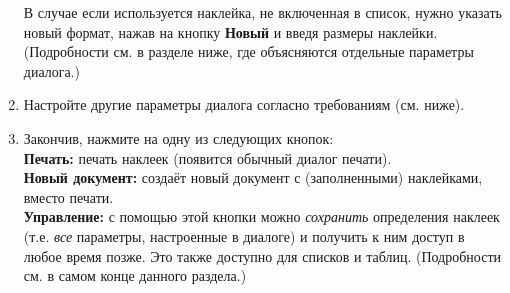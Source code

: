 ﻿\documentclass[a4paper,10pt]{article}
\begin{document}
\begin{enumerate}
 В случае если используется наклейка, не включенная в список, нужно указать новый формат, нажав на кнопку \textbf{Новый} и введя размеры наклейки. (Подробности см. в разделе ниже, где объясняются отдельные параметры диалога.)
 \item Настройте другие параметры диалога согласно требованиям (см. ниже).
 \item Закончив, нажмите на одну из следующих кнопок:\\
 \textbf{Печать:} печать наклеек (появится обычный диалог печати).\\
 \textbf{Новый документ:} создаёт новый документ с (заполненными) наклейками, вместо печати.\\
 \textbf{Управление:} с помощью этой кнопки можно \textit{сохранить} определения наклеек (т.е. \textit{все} параметры, настроенные в диалоге) и получить к ним доступ в любое время позже. Это также доступно для списков и таблиц. (Подробности см. в самом конце данного раздела.)
 \end{enumerate}
 
\end{document}

